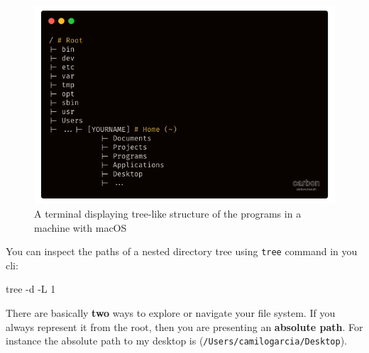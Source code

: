 \documentclass[
  letterpaper,
  DIV=11,
  numbers=noendperiod,
  oneside]{scrreprt}
\newenvironment{Shaded}{\begin{snugshade}}{\end{snugshade}}
\newcommand{\AttributeTok}[1]{\textcolor[rgb]{0.40,0.45,0.13}{#1}}
\newcommand{\ExtensionTok}[1]{\textcolor[rgb]{0.00,0.23,0.31}{#1}}
\newcommand{\NormalTok}[1]{\textcolor[rgb]{0.00,0.23,0.31}{#1}}
\begin{document}
\begin{figure}

{\centering \includegraphics{chs-command-line/imgs-cli/dir-tree.png}

}

\caption{\label{fig-tree}A terminal displaying tree-like structure of
the programs in a machine with macOS}

\end{figure}

\begin{tcolorbox}[enhanced jigsaw, opacityback=0, leftrule=.75mm, breakable, titlerule=0mm, toprule=.15mm, rightrule=.15mm, title=\textcolor{quarto-callout-tip-color}{\faLightbulb}\hspace{0.5em}{Tip}, colback=white, opacitybacktitle=0.6, toptitle=1mm, bottomtitle=1mm, colframe=quarto-callout-tip-color-frame, colbacktitle=quarto-callout-tip-color!10!white, arc=.35mm, coltitle=black, bottomrule=.15mm, left=2mm]

You can inspect the paths of a nested directory tree using \texttt{tree}
command in you cli:

\begin{Shaded}
\begin{Highlighting}[]
\ExtensionTok{tree} \AttributeTok{{-}d} \AttributeTok{{-}L}\NormalTok{ 1}
\end{Highlighting}
\end{Shaded}

\end{tcolorbox}

There are basically \textbf{two} ways to explore or navigate your file
system. If you always represent it from the root, then you are
presenting an \textbf{absolute path}. For instance the absolute path to
my desktop is (\texttt{/Users/camilogarcia/Desktop}).
\end{document}
